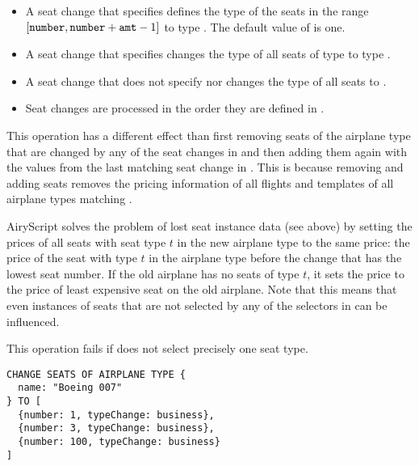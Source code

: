 \begin{itemize}
  \item A seat change that specifies  defines the type of the seats
    in the range $[\texttt{number},\texttt{number}+\texttt{amt}-1]$ to type .
    The default value of  is one.

  \item A seat change that specifies  changes the type of all
    seats of type  to type .

  \item A seat change that does not specify  nor 
    changes the type of all seats to .

  \item Seat changes are processed in the order they are defined in .
\end{itemize}

This operation has a different effect than first removing
seats of the airplane type that are changed by any of the seat changes in
 and then adding them again with the values from the last matching
seat change in . This is because removing and adding seats removes
the pricing information of all flights and templates of all airplane types
matching .

AiryScript solves the problem of lost seat instance data (see above) by setting
the prices of all seats with seat type $t$ in the new airplane type to the same
price: the price of the seat with type $t$ in the airplane type before the
change that has the lowest seat number. If the old airplane has no seats of type
$t$, it sets the price to the price of least expensive seat on the old airplane.
Note that this means that even instances of seats that are not selected by any
of the selectors in  can be influenced.

This operation fails if  does not select precisely one seat type.

\begin{texa}
  {
  \begin{lstlisting}
CHANGE SEATS OF AIRPLANE TYPE {
  name: "Boeing 007"
} TO [
  {number: 1, typeChange: business},
  {number: 3, typeChange: business},
  {number: 100, typeChange: business}
]
  \end{lstlisting}
  }
\end{texa}

